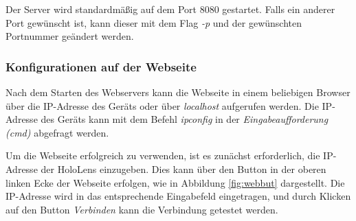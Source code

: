 
Der Server wird standardmäßig auf dem Port 8080 gestartet. Falls ein anderer Port gewünscht ist, kann dieser mit dem Flag \textit{-p} und der gewünschten Portnummer geändert werden.

\subsubsection*{Konfigurationen auf der Webseite}
Nach dem Starten des Webservers kann die Webseite in einem beliebigen Browser über die IP-Adresse des Geräts oder über \textit{localhost} aufgerufen werden. Die IP-Adresse des Geräts kann mit dem Befehl \textit{ipconfig} in der \textit{Eingabeaufforderung (cmd)} abgefragt werden.

Um die Webseite erfolgreich zu verwenden, ist es zunächst erforderlich, die IP-Adresse der HoloLens einzugeben. Dies kann über den Button in der oberen linken Ecke der Webseite erfolgen, wie in Abbildung \ref{fig:webbut} dargestellt. Die IP-Adresse wird in das entsprechende Eingabefeld eingetragen, und durch Klicken auf den Button \textit{Verbinden} kann die Verbindung getestet werden.


